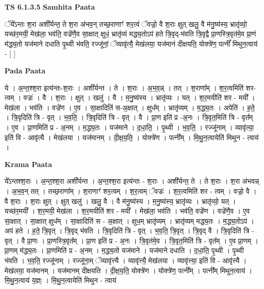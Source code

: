 \documentclass[17pt]{extarticle}
\begin{document}
\textbf{TS 6.1.3.5 } \newline
\textbf{Samhita Paata} \newline

ॅये᳚ऽन्तः श॒रा अशी᳚र्यन्त॒ ते श॒रा अ॑भव॒न् तच्छ॒राणाꣳ॑ शर॒त्वं ॅवज्रो॒ वै श॒राः क्षुत् खलु॒ वै म॑नु॒ष्य॑स्य॒ भ्रातृ॑व्यो॒ यच्छ॑र॒मयी॒ मेख॑ला॒ भव॑ति॒ वज्रे॑णै॒व सा॒क्षात् क्षुधं॒ भ्रातृ॑व्यं मद्ध्य॒तोऽप॑ हते त्रि॒वृद्-भ॑वति त्रि॒वृद्वै प्रा॒णस्त्रि॒वृत॑मे॒व प्रा॒णं म॑द्ध्य॒तो यज॑माने दधाति पृ॒थ्वी भ॑वति॒ रज्जू॑नां॒ ॅव्यावृ॑त्यै॒ मेख॑लया॒ यज॑मानं दीक्षयति॒ योक्त्रे॑ण॒ पत्नीं᳚ मिथुन॒त्वाय॑ - [  ] \newline

\textbf{Pada Paata} \newline

ये । अ॒न्त॒श्श॒रा इत्य॑न्तः-श॒राः । अशी᳚र्यन्त । ते । श॒राः । अ॒भ॒व॒न्न् । तत् । श॒राणा᳚म् । श॒र॒त्वमिति॑ शर-त्वम् । वज्रः॑ । वै । श॒राः । क्षुत् । खलु॑ । वै । म॒नु॒ष्य॑स्य । भ्रातृ॑व्यः । यत् । श॒र॒मयीति॑ शर - मयी᳚ । मेख॑ला । भव॑ति । वज्रे॑ण । ए॒व । सा॒क्षादिति॑ स-अ॒क्षात् । क्षुध᳚म् । भ्रातृ॑व्यम् । म॒द्ध्य॒तः । अपेति॑ । ह॒ते॒ । त्रि॒वृदिति॑ त्रि - वृत् । भ॒व॒ति॒ । त्रि॒वृदिति॑ त्रि - वृत् । वै । प्रा॒ण इति॑ प्र -अ॒नः । त्रि॒वृत॒मिति॑ त्रि - वृत᳚म् । ए॒व । प्रा॒णमिति॑ प्र - अ॒नम् । म॒द्ध्य॒तः । यज॑माने । द॒धा॒ति॒ । पृ॒थ्वी । भ॒व॒ति॒ । रज्जू॑नाम् । व्यावृ॑त्या॒ इति॑ वि - आवृ॑त्यै । मेख॑लया । यज॑मानम् । दी॒क्ष॒य॒ति॒ । योक्त्रे॑ण । पत्नी᳚म् । मि॒थु॒न॒त्वायेति॑ मिथुन - त्वाय॑ ।  \newline


\textbf{Krama Paata} \newline

ये᳚ऽन्तश्श॒राः । अ॒न्त॒श्श॒रा अशी᳚र्यन्त । अ॒न्त॒श्श॒रा इत्य॑न्तः - श॒राः । अशी᳚र्यन्त॒ ते । ते श॒राः । श॒रा अ॑भवन्न् । अ॒भ॒व॒न् तत् । तच्छ॒राणा᳚म् । श॒राणाꣳ॑ शर॒त्वम् । श॒र॒त्वम् ॅवज्रः॑ । श॒र॒त्वमिति॑ शर - त्वम् । वज्रो॒ वै । वै श॒राः । श॒राः क्षुत् । क्षुत् खलु॑ । खलु॒ वै । वै म॑नु॒ष्य॑स्य । म॒नु॒ष्य॑स्य॒ भ्रातृ॑व्यः । भ्रातृ॑व्यो॒ यत् । यच्छ॑र॒मयी᳚ । श॒र॒मयी॒ मेख॑ला । श॒र॒मयीति॑ शर - मयी᳚ । मेख॑ला॒ भव॑ति । भव॑ति॒ वज्रे॑ण । वज्रे॑णै॒व । ए॒व सा॒क्षात् । सा॒क्षात् क्षुध᳚म् । सा॒क्षादिति॑ स - अ॒क्षात् । क्षुध॒म् भ्रातृ॑व्यम् । भ्रातृ॑व्यम् मद्ध्य॒तः । म॒द्ध्य॒तोऽप॑ । अप॑ हते । ह॒ते॒ त्रि॒वृत् । त्रि॒वृद् भ॑वति । त्रि॒वृदिति॑ त्रि - वृत् । भ॒व॒ति॒ त्रि॒वृत् । त्रि॒वृद् वै । त्रि॒वृदिति॑ त्रि - वृत् । वै प्रा॒णः । प्रा॒णस्त्रि॒वृत᳚म् । प्रा॒ण इति॑ प्र - अ॒नः । त्रि॒वृत॑मे॒व । त्रि॒वृत॒मिति॑ त्रि - वृत᳚म् । ए॒व प्रा॒णम् । प्रा॒णम् म॑द्ध्य॒तः । प्रा॒णमिति॑ प्र - अ॒नम् । म॒द्ध्य॒तो यज॑माने । यज॑माने दधाति । द॒धा॒ति॒ पृ॒थ्वी । पृ॒थ्वी भ॑वति । भ॒व॒ति॒ रज्जू॑नाम् । रज्जू॑ना॒म् ॅव्यावृ॑त्त्यै । व्यावृ॑त्त्यै॒ मेख॑लया । व्यावृ॑त्त्या॒ इति॑ वि - आवृ॑त्त्यै । मेख॑लया॒ यज॑मानम् । यज॑मानम् दीक्षयति । दी॒क्ष॒य॒ति॒ योक्त्रे॑ण । योक्त्रे॑ण॒ पत्नी᳚म् । पत्नी᳚म् मिथुन॒त्वाय॑ । मि॒थु॒न॒त्वाय॑ य॒ज्ञ्ः । मि॒थु॒न॒त्वायेति॑ मिथुन - त्वाय॑ \newline
\end{document}
